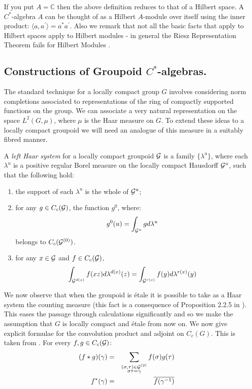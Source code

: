\begin{example}
\begin{remark}
If you put $A= \mathbb{C}$ then the above definition reduces to that of a Hilbert space. A $C^{*}$-algebra $A$ can be thought of as a Hilbert $A$-module over itself using the inner product: $\langle a, a^{'} \rangle = a^{*}a^{'}$. Also we remark that not all the basic facts that apply to Hilbert spaces apply to Hilbert modules - in general the Riesz Representation Theorem fails for Hilbert Modules \cite{MR1077390}.
\end{remark}

\subsection{Constructions of Groupoid \texorpdfstring{$C^{*}$}{C*}-algebras.}\label{Sect:GVC} The standard technique for a locally compact group $G$ involves considering norm completions associated to representations of the ring of compactly supported functions on the group. We can associate a very natural representation on the space $L^{2}(G,\mu)$, where $\mu$ is the Haar measure on $G$. To extend these ideas to a locally compact groupoid we will need an analogue of this measure in a suitably fibred manner.

\begin{definition}
A \textit{left Haar system} for a locally compact groupoid $\mathcal{G}$ is a family $\lbrace \lambda^{u} \rbrace$, where each $\lambda^{u}$ is a positive regular Borel measure on the locally compact Hausdorff $\mathcal{G}^{u}$, such that the following hold:
\begin{enumerate}
\item the support of each $\lambda^{u}$ is the whole of $\mathcal{G}^{u}$;
\item for any $g \in C_{c}(\mathcal{G})$, the function $g^{0}$, where:
\begin{equation*}
g^{0}(u)=\int_{\mathcal{G}^{u}}g d\lambda^{u}
\end{equation*}
belongs to $C_{c}(\mathcal{G}^{(0)})$.
\item for any $x \in \mathcal{G}$ and $f \in C_{c}(\mathcal{G})$,
\begin{equation*}
\int_{\mathcal{G}^{d(x)}}f(xz)d\lambda^{d(x)}(z) = \int_{\mathcal{G}^{r(x)}}f(y)d\lambda^{r(x)}(y)
\end{equation*}
\end{enumerate}
\end{definition}

We now observe that when the groupoid is \'etale it is possible to take as a Haar system the counting measure (this fact is a consequence of Proposition 2.2.5  in \cite{MR1724106}). This eases the passage through calculations significantly and so we make the assumption that $G$ is locally compact and \'etale from now on. We now give explicit formulae for the convolution product and adjoint on $C_{c}(G)$. This is taken from \cite{MR2419901}. For every $f,g \in C_{c}(\mathcal{G})$:
\begin{eqnarray*}
(f \ast g)(\gamma) & = & \sum_{\substack{(\sigma,\tau) \in \mathcal{G}^{(2)}\\ \sigma\tau=\gamma}}f(\sigma)g(\tau)\\
f^{*}(\gamma) & = & \overline{f(\gamma^{-1})} 
\end{eqnarray*}


\end{example}
